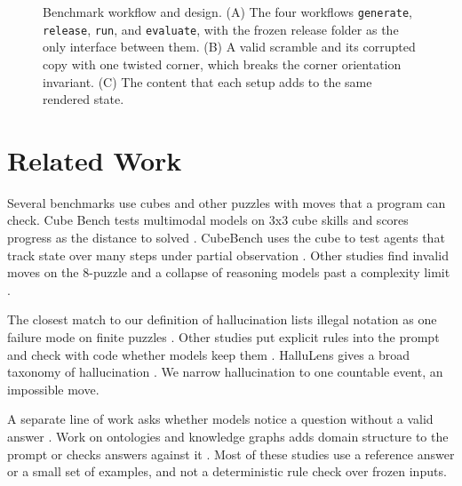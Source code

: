 \documentclass[10pt,twocolumn,letterpaper]{article}
\newcommand{\code}[1]{\texttt{#1}}
\begin{document}
\begin{figure}[t]
\begin{phcanvas}
\end{phcanvas}
\caption{Benchmark workflow and design. (A) The four workflows \code{generate}, \code{release}, \code{run}, and \code{evaluate}, with the frozen release folder as the only interface between them. (B) A valid scramble and its corrupted copy with one twisted corner, which breaks the corner orientation invariant. (C) The content that each setup adds to the same rendered state.}
\label{fig:workflow}
\end{figure}

\section{Related Work}\label{sec:related}
Several benchmarks use cubes and other puzzles with moves that a program can check. Cube Bench tests multimodal models on 3x3 cube skills and scores progress as the distance to solved \citep{cubebench}. CubeBench uses the cube to test agents that track state over many steps under partial observation \citep{cubebenchpartial}. Other studies find invalid moves on the 8-puzzle and a collapse of reasoning models past a complexity limit \citep{innateplanning,illusion,planbench}.

The closest match to our definition of hallucination lists illegal notation as one failure mode on finite puzzles \citep{complexitylimits}. Other studies put explicit rules into the prompt and check with code whether models keep them \citep{simplerules,gridgames,ludobench}. HalluLens gives a broad taxonomy of hallucination \citep{hallulens}. We narrow hallucination to one countable event, an impossible move.

A separate line of work asks whether models notice a question without a valid answer \citep{knowunknown,unsolvable,blindsolvers,solvabilityboundary}. Work on ontologies and knowledge graphs adds domain structure to the prompt or checks answers against it \citep{agrawal2024,penkov2024,magana2025,ali2026}. Most of these studies use a reference answer or a small set of examples, and not a deterministic rule check over frozen inputs.
\end{document}
